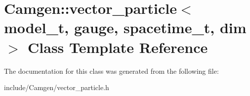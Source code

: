 \hypertarget{a00582}{}\section{Camgen\+:\+:vector\+\_\+particle$<$ model\+\_\+t, gauge, spacetime\+\_\+t, dim $>$ Class Template Reference}
\label{a00582}


The documentation for this class was generated from the following file\+:\begin{DoxyCompactItemize}
\item 
include/\+Camgen/vector\+\_\+particle.\+h\end{DoxyCompactItemize}
